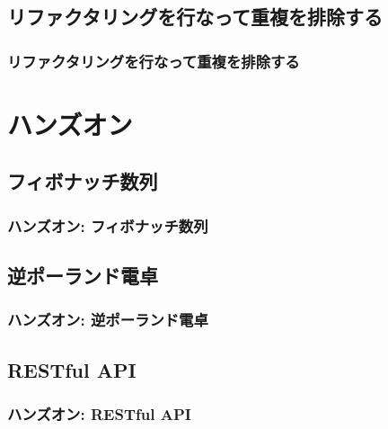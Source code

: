 \documentclass[aspectratio=169]{beamer}
\begin{document}
\subsection{リファクタリングを行なって重複を排除する}
\begin{frame}\frametitle{リファクタリングを行なって重複を排除する}
\end{frame}

\section{ハンズオン}
\subsection{フィボナッチ数列}
\begin{frame}\frametitle{ハンズオン: フィボナッチ数列}
\end{frame}

\subsection{逆ポーランド電卓}
\begin{frame}\frametitle{ハンズオン: 逆ポーランド電卓}
\end{frame}

\subsection{RESTful API}
\begin{frame}\frametitle{ハンズオン: RESTful API}
\end{frame}
\end{document}
